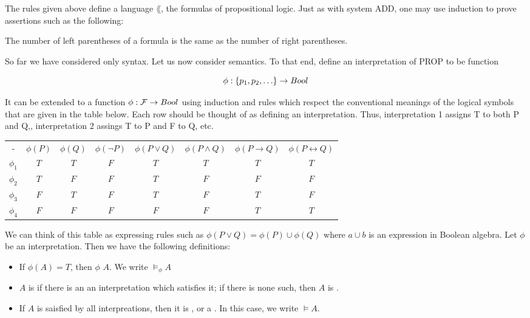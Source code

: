 The rules given above define a language $\lang$, the formulas of propositional logic.  Just as with system ADD, one may use induction to prove assertions such as the following:

\begin{proposition}
The number of left parentheses of a formula is the same as the number of right parentheses.
\end{proposition}

So far we have considered only syntax.  Let us now consider semantics.
To that end, define an interpretation of PROP to be function

\begin{equation}
\phi: \set{p_1, p_2, \dots} \to Bool
\end{equation}

It can be extended to a function $\phi: \mathcal{F} \to Bool$ using induction and rules which respect the conventional meanings of the logical symbols that are given in the table below.  Each row should be thought of as defining an interpretation. Thus, interpretation 1 assigns T to both P and Q,, interpretation 2 assings T to P and F to Q, etc.

\begin{indent}
\begin{tabular}{cccccccc}
- & $\phi(P)$ & $\phi(Q)$ & $\phi(\neg P)$ & $\phi(P \lor Q)$ & $\phi(P \land Q)$ & $\phi(P \to Q)$ & $\phi(P \leftrightarrow Q)$ \\
$\phi_1$ & $T$ & $T$ & $F$ & $T$ & $T$ & $T$ & $T$ \\
$\phi_2$ & $T$ & $F$ & $F$ & $T$ & $F$ & $F$ & $F$ \\
$\phi_3$ & $F$ & $T$ & $F$ & $T$ & $F$ & $T$ & $F$ \\
$\phi_4$ &$F$ & $F$ & $F$ & $F$ & $F$ & $T$ & $T $ \\
\end{tabular}
\end{indent}

We can think of this table as expressing rules such as $\phi(P \lor Q) = \phi(P) \cup \phi(Q)$ where $a \cup b$  is an expression in  Boolean algebra. Let $\phi$ be an interpretation. Then we have the following definitions:

\begin{itemize}

\item If $\phi(A) =T$, then  $\phi$  $A$.  We write $\models_\phi A$

\item $A$ is  if there is an an interpretation which satisfies it; if there is none such, then $A$ is .

\item If $A$ is saisfied by all interpreations, then it is , or a .  In this case, we write $\models A$.

\end{itemize}


